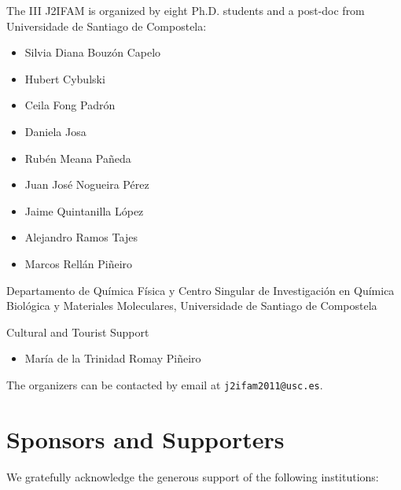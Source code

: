 \documentclass [12pt,a4paper,twoside] {book}
\begin{document}
The III J2IFAM is organized by eight Ph.D. students and a post-doc from Universidade de Santiago de Compostela:
\begin{itemize}
    \item Silvia Diana Bouzón Capelo
    \item Hubert Cybulski
    \item Ceila Fong Padrón
    \item Daniela Josa
    \item Rubén Meana Pañeda
    \item Juan José Nogueira Pérez
    \item Jaime Quintanilla López
    \item Alejandro Ramos Tajes
    \item Marcos Rellán Piñeiro
\end{itemize}

Departamento de Química Física y Centro Singular de Investigación en Química Biológica y Materiales Moleculares, Universidade de Santiago de Compostela
\\
\vspace{0.5cm}

Cultural and Tourist Support

\begin{itemize}
    \item María de la Trinidad Romay Piñeiro 
\end{itemize}

\vspace{1.0cm}

The organizers can be contacted by email at {\tt j2ifam2011@usc.es}.

\chapter*{ Sponsors and Supporters}
We gratefully acknowledge the generous support of the following institutions:
\end{document}
